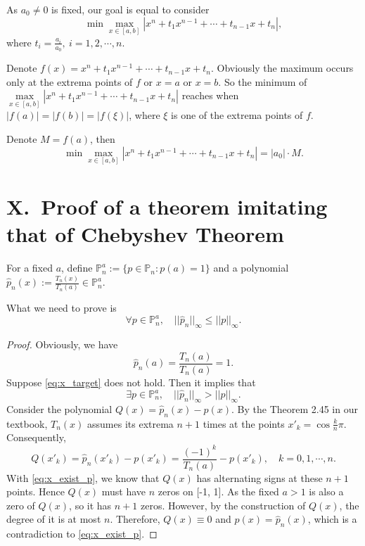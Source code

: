 \documentclass[a4paper]{article}
\begin{document}
As $a_0 \ne 0$ is fixed, our goal is equal to consider 
\begin{equation}
  \min \max\limits_{x \in [a, b]} |x^n + t_1 x^{n - 1} + \cdots + t_{n-1} x + t_n|,
  \label{eq:ix_min_max}
\end{equation}
where $t_i = \frac{a_i}{a_0},\ i = 1, 2, \cdots, n$.

Denote $f(x) = x^n + t_1 x^{n - 1} + \cdots + t_{n-1} x + t_n$. Obviously the maximum occurs only at the extrema points of $f$ or $x = a$ or $x = b$. 
So the minimum of $\max\limits_{x \in [a, b]} |x^n + t_1 x^{n - 1} + \cdots + t_{n-1} x + t_n|$ reaches when $|f(a)| = |f(b)| = |f(\xi)|$, where $\xi$ is one of the extrema points of $f$.

Denote $M = f(a)$, then 
\begin{equation}
  \min \max\limits_{x \in [a, b]} |x^n + t_1 x^{n - 1} + \cdots + t_{n-1} x + t_n| = |a_0| \cdot M.
  \label{eq:ix_min_max_final}
\end{equation}

\section*{X.\ Proof of a theorem imitating that of Chebyshev Theorem}

For a fixed $a$, define $\mathbb{P}_n^a := \{p\in \mathbb{P}_n: p(a) = 1\}$ and a polynomial $\hat{p}_n(x) := \frac{T_n(x)}{T_n(a)} \in \mathbb{P}_n^a$.

What we need to prove is 
\begin{equation}
  \forall p \in \mathbb{P}_n^a, \quad ||\hat{p}_n||_{\infty} \leqslant ||p||_{\infty}.
  \label{eq:x_target}
\end{equation}

\begin{proof}
  Obviously, we have
  \begin{equation}
    \hat{p}_n(a) = \frac{T_n(a)}{T_n(a)} = 1.
    \label{eq:x_initial_condition}
  \end{equation}
  Suppose \cref{eq:x_target} does not hold. Then it implies that 
  \begin{equation}
    \exists p \in \mathbb{P}_n^a, \quad ||\hat{p}_n||_{\infty} > ||p||_{\infty}.
    \label{eq:x_exist_p}
  \end{equation}
  Consider the polynomial $Q(x) = \hat{p}_n(x) - p(x)$. By the Theorem 2.45 in our textbook, $T_n(x)$ assumes its extrema $n + 1$ times at the points $x'_k = \cos \frac{k}{n} \pi$. 
  Consequently, 
  \begin{equation}
    Q(x'_k) = \hat{p}_n(x'_k) - p(x'_k) = \frac{(-1)^k}{T_n(a)} - p(x'_k), \quad k = 0, 1, \cdots, n.
    \label{eq:x_Q}
  \end{equation}
  With \cref{eq:x_exist_p}, we know that $Q(x)$ has alternating signs at these $n + 1$ points. Hence $Q(x)$ must have $n$ zeros on [-1, 1]. 
  As the fixed $a > 1$ is also a zero of $Q(x)$, so it has $n + 1$ zeros. However, by the construction of $Q(x)$, the degree of it is at most $n$. 
  Therefore, $Q(x) \equiv 0$ and $p(x) = \hat{p}_n(x)$, which is a contradiction to \cref{eq:x_exist_p}.
\end{proof}
\end{document}
